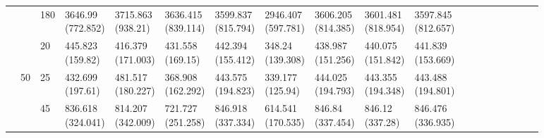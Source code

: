 \documentclass[12pt,a4paper]{article}
\begin{document}
\begin{landscape}
\begin{longtable}{lllllllllllrrrrrrrr}
 &  & 180 & \makecell{3646.99 \\ (772.852)} & \makecell{3715.863 \\ (938.21)} & \makecell{3636.415 \\ (839.114)} & \makecell{3599.837 \\ (815.794)} & \makecell{2946.407 \\ (597.781)} & \makecell{3606.205 \\ (814.385)} & \makecell{3601.481 \\ (818.954)} & \makecell{3597.845 \\ (812.657)}  \\
 &  & 20 & \makecell{445.823 \\ (159.82)} & \makecell{416.379 \\ (171.003)} & \makecell{431.558 \\ (169.15)} & \makecell{442.394 \\ (155.412)} & \makecell{348.24 \\ (139.308)} & \makecell{438.987 \\ (151.256)} & \makecell{440.075 \\ (151.842)} & \makecell{441.839 \\ (153.669)}  \\
\cline{2-19}
 & \multirow[t]{3}{*}{50} & 25 & \makecell{432.699 \\ (197.61)} & \makecell{481.517 \\ (180.227)} & \makecell{368.908 \\ (162.292)} & \makecell{443.575 \\ (194.823)} & \makecell{339.177 \\ (125.94)} & \makecell{444.025 \\ (194.793)} & \makecell{443.355 \\ (194.348)} & \makecell{443.488 \\ (194.801)} \\
 &  & 45 & \makecell{836.618 \\ (324.041)} & \makecell{814.207 \\ (342.009)} & \makecell{721.727 \\ (251.258)} & \makecell{846.918 \\ (337.334)} & \makecell{614.541 \\ (170.535)} & \makecell{846.84 \\ (337.454)} & \makecell{846.12 \\ (337.28)} & \makecell{846.476 \\ (336.935)}  \\

\end{longtable}
\end{landscape}
\end{document}
